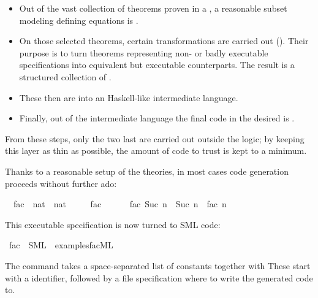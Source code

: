 \begin{isabellebody}
\begin{isamarkuptext}
\begin{itemize}
    \item Out of the vast collection of theorems proven in a
      , a reasonable subset modeling
      defining equations is .

    \item On those selected theorems, certain
      transformations are carried out
      ().  Their purpose is to turn theorems
      representing non- or badly executable
      specifications into equivalent but executable counterparts.
      The result is a structured collection of .

    \item These  then are 
      into an Haskell-like intermediate
      language.

    \item Finally, out of the intermediate language the final
      code in the desired  is .

  \end{itemize}

  From these steps, only the two last are carried out
  outside the logic; by keeping this layer as
  thin as possible, the amount of code to trust is
  kept to a minimum.%
\end{isamarkuptext}%
\isamarkuptrue%
%
\isamarkuptrue%
%
\isamarkuptrue%
%
\begin{isamarkuptext}%
Thanks to a reasonable setup of the  theories, in
  most cases code generation proceeds without further ado:%
\end{isamarkuptext}%
\isamarkuptrue%
\isamarkupfalse%
\isanewline
\ \ fac\ {\isacharcolon}{\isacharcolon}\ {\isachardoublequoteopen}nat\ {\isasymRightarrow}\ nat{\isachardoublequoteclose}\ \isanewline
\ \ \ \ {\isachardoublequoteopen}fac\ {}\ {\isacharequal}\ {}{\isachardoublequoteclose}\isanewline
\ \ {\isacharbar}\ {\isachardoublequoteopen}fac\ {\isacharparenleft}Suc\ n{\isacharparenright}\ {\isacharequal}\ Suc\ n\ {\isacharasterisk}\ fac\ n{\isachardoublequoteclose}%
\begin{isamarkuptext}%
\noindent This executable specification is now turned to SML code:%
\end{isamarkuptext}%
\isamarkuptrue%
\isamarkupfalse%
\ fac\ \ SML\ \ {\isachardoublequoteopen}examples{\isacharslash}fac{\isachardot}ML{\isachardoublequoteclose}%
\begin{isamarkuptext}%
\noindent  The \isa{{\isasymCODEGEN}} command takes a space-separated list of
  constants together with 
  These start with a 
  identifier, followed by a file specification
  where to write the generated code to.


\end{isamarkuptext}
\end{isabellebody}
